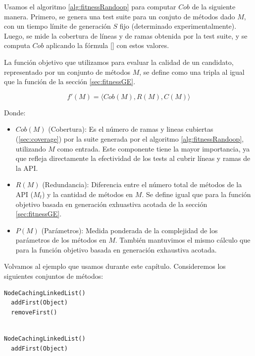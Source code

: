 Usamos el algoritmo \ref{alg:fitnessRandoop} para computar $Cob$ de la siguiente manera.
Primero, se genera una test suite para un conjuto de métodos dado $M$, con un tiempo límite
de generación $S$ fijo (determinado experimentalmente). Luego, se mide  
 la cobertura de líneas y de ramas obtenida por la test suite, y se computa
 $Cob$ aplicando la fórmula \ref{}  con estos valores.

La función objetivo que utilizamos para evaluar la calidad de un candidato, 
representado por un conjunto de métodos $M$, se define como una tripla al igual 
que la función de la sección \ref{sec:fitnessGE}.

\[
f'(M) = \langle Cob(M), R(M), C(M) \rangle
\]

Donde:

\begin{itemize}
    \item $Cob(M)$ (Cobertura): Es el número de ramas y lineas cubiertas
        (\ref{sec:coverage}) por la
        suite generada por el algoritmo \ref{alg:fitnessRandoop}, utilizando $M$ como
        entrada. 
    Este componente tiene la mayor importancia, ya que refleja directamente la
    efectividad de los tests al cubrir líneas y ramas de la API.
\item $R(M)$ (Redundancia): Diferencia entre el número total de métodos de la
    API ($M_t$) y la cantidad de métodos en $M$. Se define igual que para la
    función objetivo basada en generación exhuastiva acotada de la sección \ref{sec:fitnessGE}.
    \item $P(M)$ (Parámetros): Medida ponderada de la complejidad de los
        parámetros de los métodos en $M$. También mantuvimos el mismo cálculo
        que para la función objetivo basada en generación exhaustiva acotada.
\end{itemize}

Volvamos al ejemplo que usamos durante este capítulo. Consideremos los siguientes conjuntos de métodos:

\begin{lstlisting}[numbers=none, caption=Conjunto de métodos \( M_1 \)]
  NodeCachingLinkedList()
  addFirst(Object)
  removeFirst()
  
\end{lstlisting} 


\begin{lstlisting}[numbers=none, caption=Conjunto de métodos \( M_2 \)]
  NodeCachingLinkedList()
  addFirst(Object)

   
\end{lstlisting}


